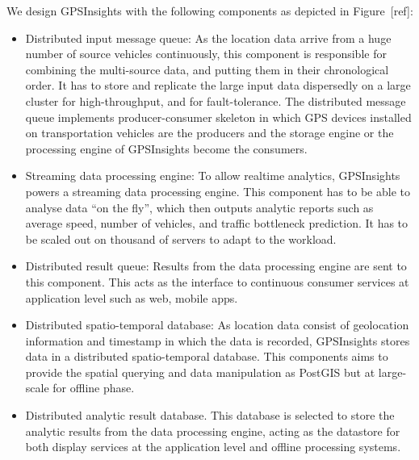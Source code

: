 \documentclass{acm_proc_article-sp}
\begin{document}

We design GPSInsights with the following components as depicted  in Figure~[ref]:

\begin{itemize}
\item 	Distributed input message queue: As the location data arrive from a huge number of source vehicles continuously, this component is responsible for combining the multi-source data, and putting them in their chronological order. It has to store and replicate the large input data dispersedly on a large cluster for high-throughput, and for fault-tolerance. The distributed message queue implements producer-consumer skeleton in which GPS devices installed on transportation vehicles are the producers and the storage engine or the processing engine of GPSInsights become the consumers.

\item  Streaming data processing engine: To allow realtime analytics, GPSInsights powers a streaming data processing engine. This component has to be able to analyse data ``on the fly'', which then outputs analytic reports such as average speed, number of vehicles, and traffic bottleneck prediction. It has to be scaled out on thousand of servers to adapt to the workload.

\item  Distributed result queue: Results from the data processing engine are sent to this component. This acts as the interface to continuous consumer services at application level such as web, mobile apps. 

\item  Distributed spatio-temporal database: As location data consist of geolocation information and timestamp in which the data is recorded, GPSInsights stores data in a distributed spatio-temporal database. This components aims to provide the spatial querying and data manipulation as PostGIS but at large-scale for offline phase. 

\item  Distributed analytic result database. This database is selected to store the analytic results from the data processing engine, acting as the datastore for both display services at the application level and offline processing systems. 

\end{itemize}
\end{document}
